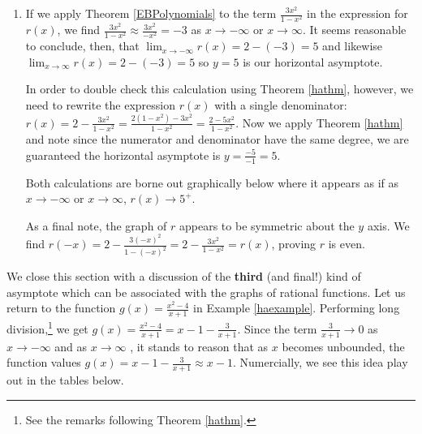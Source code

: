 \documentclass{ximera}
\begin{document}
\begin{example}
\begin{explanation}
\begin{enumerate}
\item  If we apply Theorem \ref{EBPolynomials} to the term  $\frac{3x^2}{1-x^2}$ in the expression for $r(x)$, we find   $\frac{3x^2}{1-x^2} \approx \frac{3x^2}{-x^2} = -3$ as $x \rightarrow -\infty$ or $x \rightarrow \infty$.  It  seems reasonable to conclude, then, that  $\lim_{x \rightarrow  -\infty} r(x) = 2 - (-3) = 5$ and likewise $\lim_{x \rightarrow  \infty} r(x) = 2 - (-3) = 5$ so $y = 5$ is our horizontal asymptote. 

 In order to double check this calculation using  Theorem \ref{hathm}, however, we need to rewrite the expression $r(x)$ with a single denominator:  $r(x) = 2 - \frac{3x^2}{1-x^2} = \frac{2(1-x^2) - 3x^2}{1-x^2} = \frac{2-5x^2}{1-x^2}$.  Now we apply Theorem \ref{hathm}  and note since the numerator and denominator have the same degree, we are guaranteed the horizontal asymptote is $y = \frac{-5}{-1} = 5$. 


\begin{center}
\end{center} 
 
Both  calculations are borne out graphically below where it appears as if as $x \rightarrow  -\infty$ or $x \rightarrow \infty$, $r(x) \rightarrow 5^{+}$. 

 As a final note, the graph of $r$ appears to be symmetric about the $y$ axis.  We find $r(-x) = 2 - \frac{3(-x)^2}{1-(-x)^2} = 2 - \frac{3x^2}{1-x^2} = r(x)$, proving $r$ is even.


\end{enumerate}
\end{explanation}
\end{example}


We close this section with a discussion of the \textbf{third} (and final!) kind of asymptote which can be associated with the graphs of rational functions. Let us return to the function $g(x) = \frac{x^2-4}{x+1}$ in Example \ref{haexample}. Performing long division,\footnote{See the remarks following Theorem \ref{hathm}.} we get $g(x) = \frac{x^2-4}{x+1} = x-1 - \frac{3}{x+1}$.  Since the term $\frac{3}{x+1} \rightarrow 0$ as $x \rightarrow - \infty$ and as $x \rightarrow  \infty$ , it stands to reason that as $x$ becomes unbounded, the function values   $g(x) = x-1 - \frac{3}{x+1} \approx x-1$.   Numercially, we see this idea play out in the tables below. 
\end{document}
